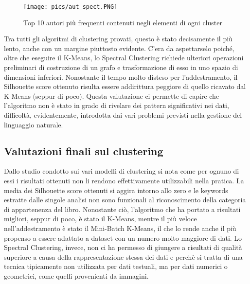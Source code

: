\documentclass[12pt,oneside]{article}
\begin{document}
\begin{enumerate}
    \begin{figure}[H]
    \texttt{[image: pics/aut\_spect.PNG]}
    \captionsetup{width=0.90\textwidth, justification=centering}
    \caption{Top 10 autori più frequenti contenuti negli elementi di ogni cluster}
    \end{figure}
    
    \begin{justify}
    Tra tutti gli algoritmi di clustering provati, questo è stato decisamente il più lento, anche con un margine piuttosto evidente. C’era da aspettarselo poiché, oltre che eseguire il K-Means, lo Spectral Clustering richiede ulteriori operazioni preliminari di costruzione di un grafo e trasformazione di esso in uno spazio di dimensioni inferiori. Nonostante il tempo molto disteso per l’addestramento, il Silhouette score ottenuto risulta essere addirittura peggiore di quello ricavato dal K-Means (seppur di poco). Questa valutazione ci permette di capire che l’algoritmo non è stato in grado di rivelare dei pattern significativi nei dati, difficoltà, evidentemente, introdotta dai vari problemi previsti nella gestione del linguaggio naturale.
    \end{justify}
    \end{enumerate}


\newpage
    \begin{enumerate}
    \subsection{Valutazioni finali sul clustering}
    \begin{justify}
        Dallo studio condotto sui vari modelli di clustering si nota come per ognuno di essi i risultati ottenuti non li rendono effettivamente utilizzabili nella pratica. La media dei Silhouette score ottenuti si aggira intorno allo zero e le keywords estratte dalle singole analisi non sono funzionali al riconoscimento della categoria di appartenenza del libro. 
        Nonostante ciò, l’algoritmo che ha portato a risultati migliori, seppur di poco, è stato il K-Means, mentre il più veloce nell’addestramento è stato il Mini-Batch K-Means, il che lo rende anche il più propenso a essere adattato a dataset con un numero molto maggiore di dati.
        Lo Spectral Clustering, invece, non ci ha permesso di giungere a risultati di qualità superiore a causa della rappresentazione stessa dei dati e perchè si tratta di una tecnica tipicamente non utilizzata per dati testuali, ma per dati numerici o geometrici, come quelli provenienti da immagini.
    \end{justify}
    \end{enumerate}
\end{document}
